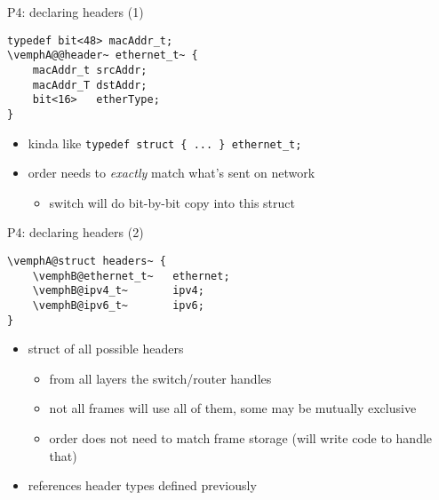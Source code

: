 \begin{frame}[fragile]{P4: declaring headers (1)}
\providecommand{\vemphA}[1]{\myemph<2>{#1}}
\providecommand{\vemphB}[1]{\myemph<3>{#1}}
\providecommand{\vemphC}[1]{\myemph<4>{#1}}
\providecommand{\vemphD}[1]{\myemph<5>{#1}}
\begin{Verbatim}[fontsize=\small,commandchars=\\@~]
typedef bit<48> macAddr_t;
\vemphA@@header~ ethernet_t~ {
    macAddr_t srcAddr;
    macAddr_T dstAddr;
    bit<16>   etherType;
}
\end{Verbatim}
\begin{itemize}
\item<2-> kinda like \Verb|typedef struct { ... } ethernet_t;|
\item<3-> order needs to \textit{exactly} match what's sent on network
    \begin{itemize}
    \item switch will do bit-by-bit copy into this struct
    \end{itemize}
\end{itemize}
\end{frame}

\begin{frame}[fragile]{P4: declaring headers (2)}
\providecommand{\vemphA}[1]{\myemph<2>{#1}}
\providecommand{\vemphB}[1]{\myemph<3>{#1}}
\providecommand{\vemphC}[1]{\myemph<4>{#1}}
\providecommand{\vemphD}[1]{\myemph<5>{#1}}
\begin{Verbatim}[fontsize=\small,commandchars=\\@~]
\vemphA@struct headers~ {
    \vemphB@ethernet_t~   ethernet;
    \vemphB@ipv4_t~       ipv4;
    \vemphB@ipv6_t~       ipv6;
}
\end{Verbatim}
\begin{itemize}
\item<2-> struct of all possible headers
    \begin{itemize}
    \item from all layers the switch/router handles
    \item not all frames will use all of them, some may be mutually exclusive
    \item order does not need to match frame storage (will write code to handle that)
    \end{itemize}
\item<3-> references header types defined previously
\end{itemize}
\end{frame}

